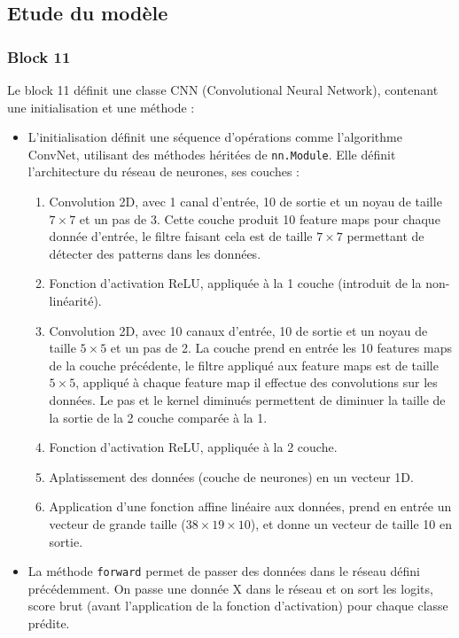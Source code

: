 \documentclass{article}
\begin{document}
\subsection{Etude du modèle}
\label{subsec:etude_model}

\subsubsection{Block 11}
Le block 11 définit une classe CNN (Convolutional Neural Network), contenant une initialisation et une méthode :
\begin{itemize}
    \item L'initialisation définit une séquence d'opérations comme l'algorithme ConvNet, utilisant des méthodes héritées de \texttt{nn.Module}. Elle définit l'architecture du réseau de neurones, ses couches :
    \begin{enumerate}
        \item Convolution 2D, avec 1 canal d'entrée, 10 de sortie et un noyau de taille $7 \times 7$ et un pas de 3. Cette couche produit 10 feature maps pour chaque donnée d'entrée, le filtre faisant cela est de taille $7 \times 7$ permettant de détecter des patterns dans les données.
        \item Fonction d'activation ReLU, appliquée à la 1\iere{} couche (introduit de la non-linéarité).
        \item Convolution 2D, avec 10 canaux d'entrée, 10 de sortie et un noyau de taille $5 \times 5$ et un pas de 2. La couche prend en entrée les 10 features maps de la couche précédente, le filtre appliqué aux feature maps est de taille $5 \times 5$, appliqué à chaque feature map il effectue des convolutions sur les données. Le pas et le kernel diminués permettent de diminuer la taille de la sortie de la 2\ieme{} couche comparée à la 1\iere{}.
        \item Fonction d'activation ReLU, appliquée à la 2\ieme{} couche.
        \item Aplatissement des données (couche de neurones) en un vecteur 1D.
        \item Application d'une fonction affine linéaire aux données, prend en entrée un vecteur de grande taille ($38 \times 19 \times 10$), et donne un vecteur de taille 10 en sortie.
    \end{enumerate}
    \item La méthode \texttt{forward} permet de passer des données dans le réseau défini précédemment. On passe une donnée X dans le réseau et on sort les logits, score brut (avant l'application de la fonction d'activation) pour chaque classe prédite.
\end{itemize}
\end{document}

